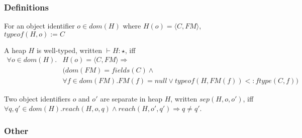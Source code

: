 \subsubsection{Definitions}
\begin{definition}
  For an object identifier $o \in dom(H)$ where $H(o) = \langle C, FM \rangle$, $typeof(H, o) := C$
\end{definition}

\begin{definition}
A heap $H$ is well-typed, written $\vdash H : \star$, iff
\begin{equation}
\begin{split}
  \forall o \in dom(H). & H(o) = \langle C, FM \rangle \Longrightarrow\\
                        & (dom(FM) = fields(C) \wedge\\
                        & \forall f \in dom(FM). FM(f)= null \vee typeof(H, FM(f)) <: ftype(C, f))
\end{split}
\end{equation}
\end{definition}

\begin{definition}[Separation]
  Two object identifiers $o$ and $o'$ are separate in heap $H$, written $sep(H, o, o')$, iff $\forall q, q' \in dom(H). reach(H, o, q) \wedge reach(H, o', q') \Longrightarrow q \neq q'$.
\end{definition}

\subsubsection{Other}
\inference[]{}{}
\inference[]{}{}
\inference[]{}{}
\inference[]{}{}
\inference[]{}{}
